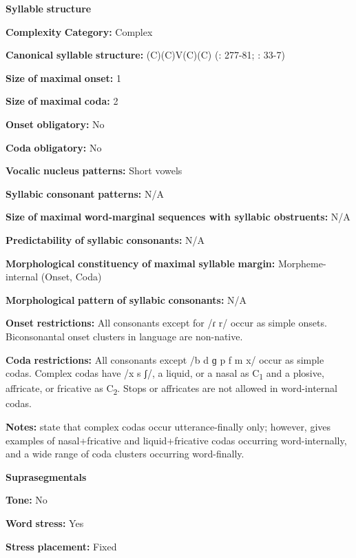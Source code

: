\textbf{Syllable} \textbf{structure}

\textbf{Complexity} \textbf{Category:} Complex

\textbf{Canonical} \textbf{syllable} \textbf{structure:} (C)(C)V(C)(C) (\citealt{SaltarelliEtAl1988}: 277-81; \citealt{Hualde2003}: 33-7)

\textbf{Size} \textbf{of} \textbf{maximal} \textbf{onset:} 1

\textbf{Size} \textbf{of} \textbf{maximal} \textbf{coda:} 2

\textbf{Onset} \textbf{obligatory:} No

\textbf{Coda} \textbf{obligatory:} No

\textbf{Vocalic} \textbf{nucleus} \textbf{patterns:} Short vowels

\textbf{Syllabic} \textbf{consonant} \textbf{patterns:} N/A

\textbf{Size} \textbf{of} \textbf{maximal} \textbf{word{}-marginal sequences with syllabic obstruents:} N/A

\textbf{Predictability} \textbf{of} \textbf{syllabic} \textbf{consonants:} N/A

\textbf{Morphological} \textbf{constituency} \textbf{of} \textbf{maximal} \textbf{syllable} \textbf{margin:} Morpheme-internal (Onset, Coda)

\textbf{Morphological} \textbf{pattern} \textbf{of} \textbf{syllabic} \textbf{consonants:} N/A

\textbf{Onset} \textbf{restrictions:} All consonants except for /ɾ r/ occur as simple onsets. Biconsonantal onset clusters in language are non-native.

\textbf{Coda} \textbf{restrictions:} All consonants except /b d ɡ p f m x/ occur as simple codas. Complex codas have /x s ʃ/, a liquid, or a nasal as C\textsubscript{1} and a plosive, affricate, or fricative as C\textsubscript{2}. Stops or affricates are not allowed in word-internal codas.

\textbf{Notes:} \citet{SaltarelliEtAl1988} state that complex codas occur utterance-finally only; however, \citet{Hualde2003} gives examples of nasal+fricative and liquid+fricative codas occurring word-internally, and a wide range of coda clusters occurring word-finally.

\textbf{Suprasegmentals}

\textbf{Tone:} No

\textbf{Word} \textbf{stress:} Yes

\textbf{Stress} \textbf{placement:} Fixed


